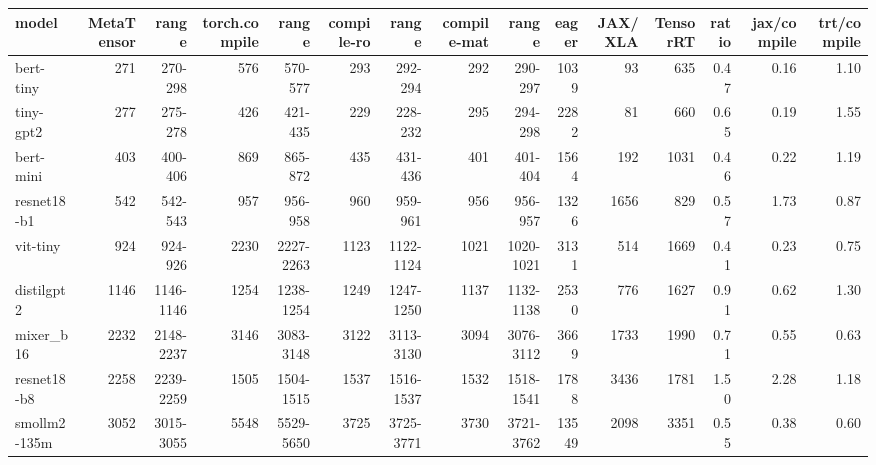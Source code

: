 \begin{tabular}{lrrrrrrrrrrrrrr}
\toprule
model & MetaTensor & range & torch.compile & range & compile-ro & range & compile-mat & range & eager & JAX/XLA & TensorRT & ratio & jax/compile & trt/compile \\
\midrule
bert-tiny & 271 & 270-298 & 576 & 570-577 & 293 & 292-294 & 292 & 290-297 & 1039 & 93 & 635 & 0.47 & 0.16 & 1.10 \\
tiny-gpt2 & 277 & 275-278 & 426 & 421-435 & 229 & 228-232 & 295 & 294-298 & 2282 & 81 & 660 & 0.65 & 0.19 & 1.55 \\
bert-mini & 403 & 400-406 & 869 & 865-872 & 435 & 431-436 & 401 & 401-404 & 1564 & 192 & 1031 & 0.46 & 0.22 & 1.19 \\
resnet18-b1 & 542 & 542-543 & 957 & 956-958 & 960 & 959-961 & 956 & 956-957 & 1326 & 1656 & 829 & 0.57 & 1.73 & 0.87 \\
vit-tiny & 924 & 924-926 & 2230 & 2227-2263 & 1123 & 1122-1124 & 1021 & 1020-1021 & 3131 & 514 & 1669 & 0.41 & 0.23 & 0.75 \\
distilgpt2 & 1146 & 1146-1146 & 1254 & 1238-1254 & 1249 & 1247-1250 & 1137 & 1132-1138 & 2530 & 776 & 1627 & 0.91 & 0.62 & 1.30 \\
mixer\_b16 & 2232 & 2148-2237 & 3146 & 3083-3148 & 3122 & 3113-3130 & 3094 & 3076-3112 & 3669 & 1733 & 1990 & 0.71 & 0.55 & 0.63 \\
resnet18-b8 & 2258 & 2239-2259 & 1505 & 1504-1515 & 1537 & 1516-1537 & 1532 & 1518-1541 & 1788 & 3436 & 1781 & 1.50 & 2.28 & 1.18 \\
smollm2-135m & 3052 & 3015-3055 & 5548 & 5529-5650 & 3725 & 3725-3771 & 3730 & 3721-3762 & 13549 & 2098 & 3351 & 0.55 & 0.38 & 0.60 \\
\bottomrule
\end{tabular}
